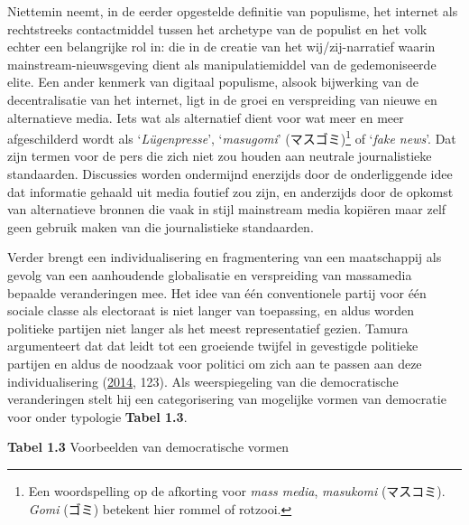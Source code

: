 \documentclass[10.5pt,dutch,]{article}
\begin{document}
Niettemin neemt, in de eerder opgestelde definitie van populisme, het
internet als rechtstreeks contactmiddel tussen het archetype van de
populist en het volk echter een belangrijke rol in: die in de creatie
van het wij/zij-narratief waarin mainstream-nieuwsgeving dient als
manipulatiemiddel van de gedemoniseerde elite. Een ander kenmerk van
digitaal populisme, alsook bijwerking van de decentralisatie van het
internet, ligt in de groei en verspreiding van nieuwe en alternatieve
media. Iets wat als alternatief dient voor wat meer en meer
afgeschilderd wordt als `\emph{Lügenpresse}', `\emph{masugomi}'
(マスゴミ)\footnote{Een woordspelling op de afkorting voor \emph{mass
  media}, \emph{masukomi} (マスコミ). \emph{Gomi} (ゴミ) betekent hier
  rommel of rotzooi.} of `\emph{fake news}'. Dat zijn termen voor de
pers die zich niet zou houden aan neutrale journalistieke standaarden.
Discussies worden ondermijnd enerzijds door de onderliggende idee dat
informatie gehaald uit media foutief zou zijn, en anderzijds door de
opkomst van alternatieve bronnen die vaak in stijl mainstream media
kopiëren maar zelf geen gebruik maken van die journalistieke
standaarden.

Verder brengt een individualisering en fragmentering van een
maatschappij als gevolg van een aanhoudende globalisatie en verspreiding
van massamedia bepaalde veranderingen mee. Het idee van één
conventionele partij voor één sociale classe als electoraat is niet
langer van toepassing, en aldus worden politieke partijen niet langer
als het meest representatief gezien. Tamura argumenteert dat dat leidt
tot een groeiende twijfel in gevestigde politieke partijen en aldus de
noodzaak voor politici om zich aan te passen aan deze individualisering
(\protect\hyperlink{ref-tamuraux5fnigglingux5f2014}{2014}, 123). Als
weerspiegeling van die democratische veranderingen stelt hij een
categorisering van mogelijke vormen van democratie voor onder typologie
\textbf{Tabel 1.3}.

\textbf{Tabel 1.3} Voorbeelden van democratische vormen
\end{document}
